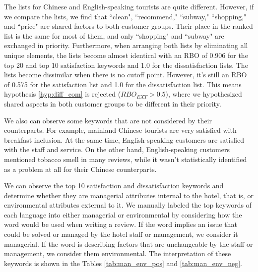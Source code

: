 \documentclass[smallextended,natbib]{svjour3}       %
\begin{document}
    The lists for Chinese and English-speaking tourists are quite different. However, if we compare the lists, we find that ``clean", ``recommend," ``subway," ``shopping,"  and ``price" are shared factors to both customer groups. Their place in the ranked list is the same for most of them, and only ``shopping" and ``subway" are exchanged in priority. Furthermore, when arranging both lists by eliminating all unique elements, the lists become almost identical with an RBO of 0.906 for the top 20 and top 10 satisfaction keywords and 1.0 for the dissatisfaction lists. The lists become dissimilar when there is no cutoff point. However, it's still an RBO of 0.575 for the satisfaction list and 1.0 for the dissatisfaction list. This means hypothesis \ref{hyp:diff_com} is rejected (\(RBO_{EXT} > 0.5\)), where we hypothesized shared aspects in both customer groups to be different in their priority.

    We also can observe some keywords that are not considered by their counterparts. For example, mainland Chinese tourists are very satisfied with breakfast inclusion. At the same time, English-speaking customers are satisfied with the staff and service. On the other hand, English-speaking customers mentioned tobacco smell in many reviews, while it wasn't statistically identified as a problem at all for their Chinese counterparts.

    We can observe the top 10 satisfaction and dissatisfaction keywords and determine whether they are managerial attributes internal to the hotel, that is, or environmental attributes external to it. We manually labeled the top keywords of each language into either managerial or environmental by considering how the word would be used when writing a review. If the word implies an issue that could be solved or managed by the hotel staff or management, we consider it managerial. If the word is describing factors that are unchangeable by the staff or management, we consider them environmental. The interpretation of these keywords is shown in the Tables \ref{tab:man_env_pos} and \ref{tab:man_env_neg}.
\end{document}
